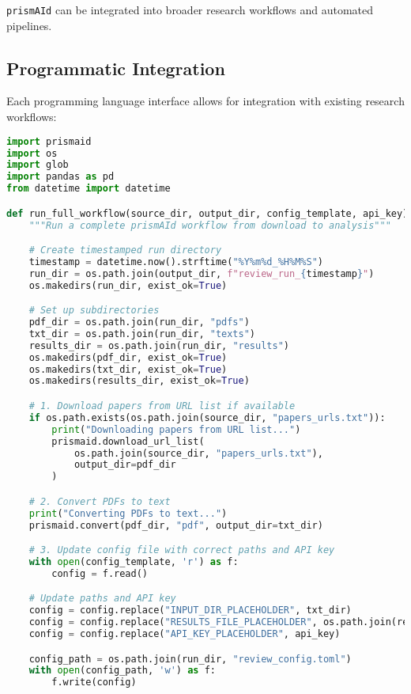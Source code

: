 \texttt{prismAId} can be integrated into broader research workflows and automated pipelines.

\subsection{Programmatic Integration}

Each programming language interface allows for integration with existing research workflows:

\begin{commandbox}
\begin{lstlisting}[language=Python]
import prismaid
import os
import glob
import pandas as pd
from datetime import datetime

def run_full_workflow(source_dir, output_dir, config_template, api_key):
    """Run a complete prismAId workflow from download to analysis"""

    # Create timestamped run directory
    timestamp = datetime.now().strftime("%Y%m%d_%H%M%S")
    run_dir = os.path.join(output_dir, f"review_run_{timestamp}")
    os.makedirs(run_dir, exist_ok=True)

    # Set up subdirectories
    pdf_dir = os.path.join(run_dir, "pdfs")
    txt_dir = os.path.join(run_dir, "texts")
    results_dir = os.path.join(run_dir, "results")
    os.makedirs(pdf_dir, exist_ok=True)
    os.makedirs(txt_dir, exist_ok=True)
    os.makedirs(results_dir, exist_ok=True)

    # 1. Download papers from URL list if available
    if os.path.exists(os.path.join(source_dir, "papers_urls.txt")):
        print("Downloading papers from URL list...")
        prismaid.download_url_list(
            os.path.join(source_dir, "papers_urls.txt"),
            output_dir=pdf_dir
        )

    # 2. Convert PDFs to text
    print("Converting PDFs to text...")
    prismaid.convert(pdf_dir, "pdf", output_dir=txt_dir)

    # 3. Update config file with correct paths and API key
    with open(config_template, 'r') as f:
        config = f.read()

    # Update paths and API key
    config = config.replace("INPUT_DIR_PLACEHOLDER", txt_dir)
    config = config.replace("RESULTS_FILE_PLACEHOLDER", os.path.join(results_dir, "review_results"))
    config = config.replace("API_KEY_PLACEHOLDER", api_key)

    config_path = os.path.join(run_dir, "review_config.toml")
    with open(config_path, 'w') as f:
        f.write(config)


\end{lstlisting}
\end{commandbox}
